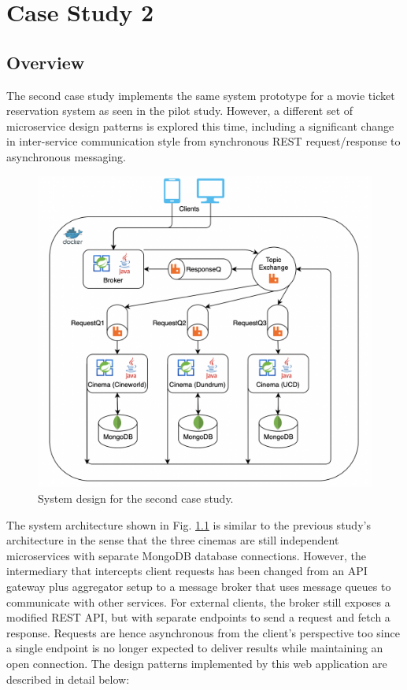 \chapter{Case Study 2}

\section{Overview}

The second case study implements the same system prototype for a movie ticket reservation system as seen in the pilot study. However, a different set of microservice design patterns is explored this time, including a significant change in inter-service communication style from synchronous REST request/response to asynchronous messaging.

\begin{figure}[H]
  \centering
  \includegraphics[width=0.6\linewidth]{./assets/diagrams/cs02-arch.png}
  \caption{System design for the second case study.}
  \label{fig:cs02-arch}
\end{figure}

The system architecture shown in Fig. \ref{fig:cs02-arch} is similar to the previous study's architecture in the sense that the three cinemas are still independent microservices with separate MongoDB database connections. However, the intermediary that intercepts client requests has been changed from an API gateway plus aggregator setup to a message broker that uses message queues to communicate with other services. For external clients, the broker still exposes a modified REST API, but with separate endpoints to send a request and fetch a response. Requests are hence asynchronous from the client's perspective too since a single endpoint is no longer expected to deliver results while maintaining an open connection. The design patterns implemented by this web application are described in detail below:

